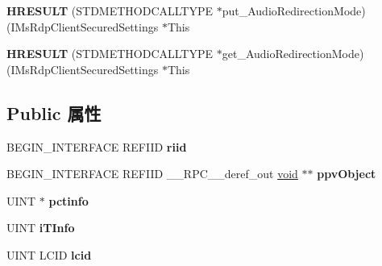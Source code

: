 \begin{DoxyCompactItemize}
{\bfseries H\+R\+E\+S\+U\+LT} (S\+T\+D\+M\+E\+T\+H\+O\+D\+C\+A\+L\+L\+T\+Y\+PE $\ast$put\+\_\+\+Audio\+Redirection\+Mode)(I\+Ms\+Rdp\+Client\+Secured\+Settings $\ast$This
\item 
\mbox{\label{struct_i_ms_rdp_client_secured_settings_vtbl_abe28d686b44367034a081ca531fb33ac}} 
{\bfseries H\+R\+E\+S\+U\+LT} (S\+T\+D\+M\+E\+T\+H\+O\+D\+C\+A\+L\+L\+T\+Y\+PE $\ast$get\+\_\+\+Audio\+Redirection\+Mode)(I\+Ms\+Rdp\+Client\+Secured\+Settings $\ast$This
\end{DoxyCompactItemize}
\subsection*{Public 属性}
\begin{DoxyCompactItemize}
\item 
\mbox{\label{struct_i_ms_rdp_client_secured_settings_vtbl_a3af7a59701dbd41907d1495cbe1d7d37}} 
B\+E\+G\+I\+N\+\_\+\+I\+N\+T\+E\+R\+F\+A\+CE R\+E\+F\+I\+ID {\bfseries riid}
\item 
\mbox{\label{struct_i_ms_rdp_client_secured_settings_vtbl_a10ad70c0a6d4a9d42f5d0aea28c72ac4}} 
B\+E\+G\+I\+N\+\_\+\+I\+N\+T\+E\+R\+F\+A\+CE R\+E\+F\+I\+ID \+\_\+\+\_\+\+R\+P\+C\+\_\+\+\_\+deref\+\_\+out \hyperlink{interfacevoid}{void} $\ast$$\ast$ {\bfseries ppv\+Object}
\item 
\mbox{\label{struct_i_ms_rdp_client_secured_settings_vtbl_a12cf6e7397b2784e35d96af0cd985b79}} 
U\+I\+NT $\ast$ {\bfseries pctinfo}
\item 
\mbox{\label{struct_i_ms_rdp_client_secured_settings_vtbl_aa53ad06c28049969a796aa6c204236ef}} 
U\+I\+NT {\bfseries i\+T\+Info}
\item 
\mbox{\label{struct_i_ms_rdp_client_secured_settings_vtbl_aebbec4987103b3e0e6bee0547ca7c19a}} 
U\+I\+NT L\+C\+ID {\bfseries lcid}
\item 
\mbox{\label{struct_i_ms_rdp_client_secured_settings_vtbl_a312505328ccf619940aaeff45d18f6a4}} 
$$
\end{DoxyCompactItemize}
